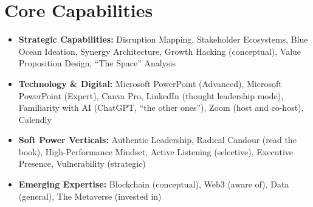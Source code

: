 \section*{Core Capabilities}

\begin{itemize}[leftmargin=1.4em, label=\textbullet, topsep=2pt, itemsep=1pt, parsep=0pt]
  \small
  \item \textbf{Strategic Capabilities:} Disruption Mapping, Stakeholder Ecosystems, Blue Ocean Ideation, Synergy Architecture, Growth Hacking (conceptual), Value Proposition Design, ``The Space'' Analysis
  \item \textbf{Technology \& Digital:} Microsoft PowerPoint (Advanced), Microsoft PowerPoint (Expert), Canva Pro, LinkedIn (thought leadership mode), Familiarity with AI (ChatGPT, ``the other ones''), Zoom (host and co-host), Calendly
  \item \textbf{Soft Power Verticals:} Authentic Leadership, Radical Candour (read the book), High-Performance Mindset, Active Listening (selective), Executive Presence, Vulnerability (strategic)
  \item \textbf{Emerging Expertise:} Blockchain (conceptual), Web3 (aware of), Data (general), The Metaverse (invested in)
\end{itemize}
